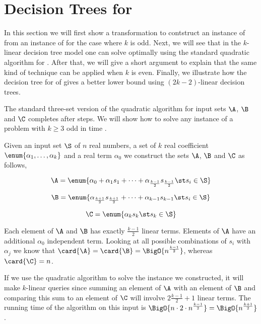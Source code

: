 \section{Decision Trees for \kLDT}
\label{tree:3sum:kldt}

In this section we will first show a transformation to contstruct an instance
of \threeSUM from an instance of \kLDT for the case where \(k\) is odd. Next, we will
see that in the \(k\)-linear decision tree model one can solve \kLDT optimally
using the standard quadratic algorithm for \threeSUM. After that, we will give a
short argument to explain that the same kind of technique can be applied when
\(k\) is even. Finally, we illustrate how the decision tree for \threeSUM of
\citet*{gronlund:2014} gives a better lower bound using \((2k-2)\)-linear
decision trees.

The standard three-set version of the quadratic \threeSUM algorithm for input
sets \(\A\), \(\B\) and \(\C\) completes after \BigO{\card{\C} ( \card{\A} +
\card{\B} ) } steps. We will show how to solve any instance of a \kLDT problem
with \(k \ge 3\) odd in time .

Given an input set \(\S\) of \(n\) real numbers, a set of \(k\) real
coefficient \( \enum{\alpha_1,\ldots,\alpha_k}\) and a real term \(\alpha_0\)
we construct the sets \(\A\), \(\B\) and \(\C\) as follows,

\begin{displaymath}
\A = \enum{\alpha_0 + \alpha_1 s_1 + \cdots + \alpha_{\frac{k-1}{2}} s_{\frac{k-1}{2}} \st s_i \in \S}
\end{displaymath}

\begin{displaymath}
\B = \enum{\alpha_{\frac{k+1}{2}} s_{\frac{k+1}{2}} + \cdots + \alpha_{k-1} s_{k-1} \st s_i \in \S}
\end{displaymath}

\begin{displaymath}
\C = \enum{\alpha_k s_k \st s_k \in \S}
\end{displaymath}

Each element of \(\A\) and \(\B\) has exactly \(\frac{k-1}{2}\) linear terms.
Elements of \(\A\) have an additional \(\alpha_0\) independent term. Looking
at all possible combinations of \(s_i\) with \(\alpha_j\) we know that
\(\card{\A} = \card{\B} = \BigO{n^{\frac{k-1}{2}}}\), whereas \(\card{\C} =
n\).

If we use the quadratic \threeSUM algorithm to solve the instance we
constructed, it will make \(k\)-linear queries since summing an element of
\(\A\) with an element of \(\B\) and comparing this sum to an element of
\(\C\) will involve \(2 \frac{k-1}{2} + 1\) linear terms. The running time of
the \threeSUM algorithm on this input is \(\BigO{n \cdot 2 \cdot n^{\frac{k-1}{2}}} =
\BigO{n^{\frac{k+1}{2}}}\).

